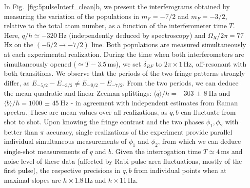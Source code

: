 In Fig.~\ref{fig:5pulseInterf_clean}b, we present the interferograms obtained by measuring the variation of the populations in $m_F = -7/2$ and $m_F = -3/2$,  relative to the total atom number, as a function of the interferometer time $T$. Here, $q / h \simeq \SI{-320}{\hertz}$ (independently deduced by spectroscopy)
and {$\Omega_R/2\pi = 77$\,Hz} on the $(-5/2 \rightarrow -7/2)$ line. Both populations are measured simultaneously at each experimental realization. During the time when both interferometers are simultaneously opened ($\simeq T - 3.5\,$ms), we set $\delta_{RF}$ to $2 \pi \times 1\,$Hz, off-resonant with both transitions. We observe that the periods of the two fringe patterns strongly differ, as $E_{-5/2} - E_{-3/2} \neq E_{-9/2} - E_{-7/2}$. From the two periods, we can deduce the mean quadratic and linear Zeeman splittings: $\langle q \rangle / h = \SI{-303(8)}{\hertz}$ and $\langle b \rangle / h = \SI{1000(45)}{\hertz}$ - in agreement with independent estimates from Raman spectra. These are mean values over all realizations, as $q,b$ can fluctuate from shot to shot. Upon knowing the fringe contrast and the two phases $\phi_1,\phi_2$ with better than $\pi$ accuracy, single realizations of the experiment provide parallel individual simultaneous measurements of $\phi_1$ and $\phi_2$, from which we can deduce single-shot measurements of $q$ and $b$. Given the interrogation time $T \simeq 4\,$ms and noise level of these data (affected by Rabi pulse area fluctuations, mostly of the first pulse), the respective precisions in $q,b$ from individual points when at maximal slopes are {$h \times 1.8$\,Hz} and {$h\times 11$\,Hz}. 


